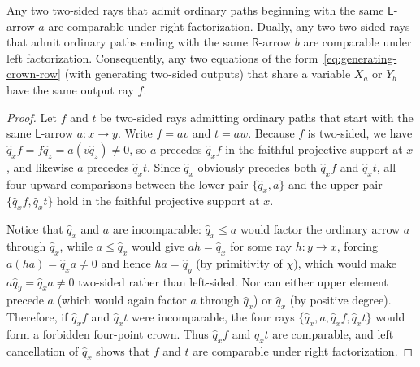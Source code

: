 \begin{lemma}
\label{lem:crown-output-comparison}
Any two two-sided rays that admit ordinary paths beginning with the same $\mathsf L$-arrow $a$ are comparable under right factorization. Dually, any two two-sided rays that admit ordinary paths ending with the same $\mathsf R$-arrow $b$ are comparable under left factorization. Consequently, any two equations of the form~\eqref{eq:generating-crown-row} (with generating two-sided outputs) that share a variable $X_a$ or $Y_b$ have the same output ray $f$.
\end{lemma}
\begin{proof}
Let $f$ and $t$ be two-sided rays admitting ordinary paths that start with the same $\mathsf L$-arrow $a\colon x\to y$. Write $f=av$ and $t=aw$. Because $f$ is two-sided, we have $\widehat q_xf=f\widehat q_z=a(v\widehat q_z)\ne0$, so $a$ precedes $\widehat q_xf$ in the faithful projective support at $x$, and likewise $a$ precedes $\widehat q_xt$. Since $\widehat q_x$ obviously precedes both $\widehat q_xf$ and $\widehat q_xt$, all four upward comparisons between the lower pair $\{\widehat q_x,a\}$ and the upper pair $\{\widehat q_xf,\widehat q_xt\}$ hold in the faithful projective support at $x$.

Notice that $\widehat q_x$ and $a$ are incomparable: $\widehat q_x\leq a$ would factor the ordinary arrow $a$ through $\widehat q_x$, while $a\leq\widehat q_x$ would give $ah=\widehat q_x$ for some ray $h\colon y\to x$, forcing $a(ha)=\widehat q_xa\ne0$ and hence $ha=\widehat q_y$ (by primitivity of $\chi$), which would make $a\widehat q_y=\widehat q_xa\ne0$ two-sided rather than left-sided. Nor can either upper element precede $a$ (which would again factor $a$ through $\widehat q_x$) or $\widehat q_x$ (by positive degree). Therefore, if $\widehat q_xf$ and $\widehat q_xt$ were incomparable, the four rays $\{\widehat q_x,a,\widehat q_xf,\widehat q_xt\}$ would form a forbidden four-point crown. Thus $\widehat q_xf$ and $\widehat q_xt$ are comparable, and left cancellation of $\widehat q_x$ shows that $f$ and $t$ are comparable under right factorization.


\end{proof}
